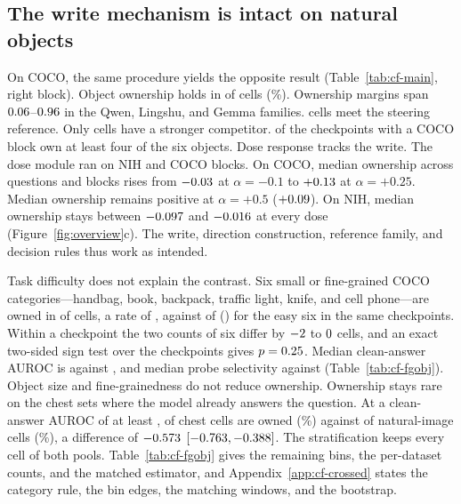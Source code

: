 \subsection{The write mechanism is intact on natural objects}
\label{sec:coco}

On COCO, the same procedure yields the opposite result (Table~\ref{tab:cf-main}, right block). Object ownership holds in \cfCocoOwned{} of \cfCocoOwnedN{} cells (\cfCocoOwnedPct\%). Ownership margins span $0.06$--$0.96$ in the Qwen, Lingshu, and Gemma families. \cfCocoRefMet{} cells meet the steering reference. Only \cfCocoCompetitor{} cells have a stronger competitor. \cfCocoBlocksFourPlus{} of the \cfCocoBlocks{} checkpoints with a COCO block own at least four of the six objects. Dose response tracks the write. The dose module ran on \cfDoseBlocksNih{} NIH and \cfDoseBlocksCoco{} COCO blocks. On COCO, median ownership across questions and blocks rises from $-0.03$ at $\alpha=-0.1$ to $+0.13$ at $\alpha=+0.25$. Median ownership remains positive at $\alpha=+0.5$ ($+0.09$). On NIH, median ownership stays between $-0.097$ and $-0.016$ at every dose (Figure~\ref{fig:overview}c). The write, direction construction, reference family, and decision rules thus work as intended.

Task difficulty does not explain the contrast. Six small or fine-grained COCO categories---handbag, book, backpack, traffic light, knife, and cell phone---are owned in \cfFgFineOwned{} of \cfFgFineCells{} cells, a rate of \cfFgFineRate{}, against \cfFgEasySameOwned{} of \cfFgEasySameCells{} (\cfFgEasySameRate{}) for the easy six in the same \cfFgSameBlocks{} checkpoints. Within a checkpoint the two counts of six differ by $-2$ to $0$ cells, and an exact two-sided sign test over the checkpoints gives $p=0.25$. Median clean-answer AUROC is \cfFgFineAuroc{} against \cfFgEasySameAuroc{}, and median probe selectivity \cfFgFineSel{} against \cfFgEasySameSel{} (Table~\ref{tab:cf-fgobj}). Object size and fine-grainedness do not reduce ownership. Ownership stays rare on the chest sets where the model already answers the question. At a clean-answer AUROC of at least \cfStratTopEdge{}, \cfStratChestTopOwned{} of \cfStratChestTopN{} chest cells are owned (\cfStratChestTopPct\%) against \cfStratNatTopOwned{} of \cfStratNatTopN{} natural-image cells (\cfStratNatTopPct\%), a difference of $-0.573$ $[-0.763,-0.388]$. The stratification keeps every cell of both pools. Table~\ref{tab:cf-fgobj} gives the remaining bins, the per-dataset counts, and the matched estimator, and Appendix~\ref{app:cf-crossed} states the category rule, the bin edges, the matching windows, and the bootstrap.

